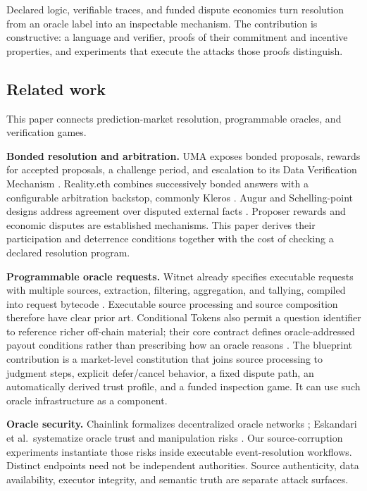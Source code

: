 \documentclass[10pt]{article}
\begin{document}
Declared logic, verifiable traces, and funded dispute economics turn resolution from an oracle label into an inspectable mechanism. The contribution is constructive: a language and verifier, proofs of their commitment and incentive properties, and experiments that execute the attacks those proofs distinguish.

\subsection{Related work}

This paper connects prediction-market resolution, programmable oracles, and verification games.

\textbf{Bonded resolution and arbitration.} UMA exposes bonded proposals, rewards for accepted proposals, a challenge period, and escalation to its Data Verification Mechanism \cite{uma2021}. Reality.eth combines successively bonded answers with a configurable arbitration backstop, commonly Kleros \cite{realityeth,kleros2019}. Augur and Schelling-point designs address agreement over disputed external facts \cite{augurv2,buterin2014,sztorc2015}. Proposer rewards and economic disputes are established mechanisms. This paper derives their participation and deterrence conditions together with the cost of checking a declared resolution program.

\textbf{Programmable oracle requests.} Witnet already specifies executable requests with multiple sources, extraction, filtering, aggregation, and tallying, compiled into request bytecode \cite{witnet2026}. Executable source processing and source composition therefore have clear prior art. Conditional Tokens also permit a question identifier to reference richer off-chain material; their core contract defines oracle-addressed payout conditions rather than prescribing how an oracle reasons \cite{gnosisct2026}. The blueprint contribution is a market-level constitution that joins source processing to judgment steps, explicit defer/cancel behavior, a fixed dispute path, an automatically derived trust profile, and a funded inspection game. It can use such oracle infrastructure as a component.

\textbf{Oracle security.} Chainlink formalizes decentralized oracle networks \cite{chainlink2017}; Eskandari et al.\ systematize oracle trust and manipulation risks \cite{eskandari2021}. Our source-corruption experiments instantiate those risks inside executable event-resolution workflows. Distinct endpoints need not be independent authorities. Source authenticity, data availability, executor integrity, and semantic truth are separate attack surfaces.
\end{document}
